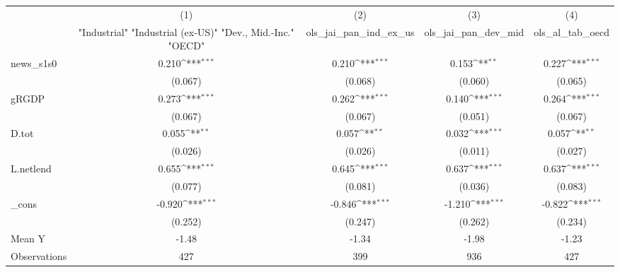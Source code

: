 {
\def\sym#1{\ifmmode^{#1}\else\(^{#1}\)\fi}
\begin{tabular}{l*{4}{c}}
\toprule
            &\multicolumn{1}{c}{(1)}&\multicolumn{1}{c}{(2)}&\multicolumn{1}{c}{(3)}&\multicolumn{1}{c}{(4)}\\
            &\multicolumn{1}{c}{ "Industrial" "Industrial (ex-US)" "Dev., Mid.-Inc." "OECD" }&\multicolumn{1}{c}{ols\_jai\_pan\_ind\_ex\_us}&\multicolumn{1}{c}{ols\_jai\_pan\_dev\_mid}&\multicolumn{1}{c}{ols\_al\_tab\_oecd}\\
\midrule
news\_s1s0   &       0.210\sym{***}&       0.210\sym{***}&       0.153\sym{**} &       0.227\sym{***}\\
            &     (0.067)         &     (0.068)         &     (0.060)         &     (0.065)         \\
\addlinespace
gRGDP       &       0.273\sym{***}&       0.262\sym{***}&       0.140\sym{***}&       0.264\sym{***}\\
            &     (0.067)         &     (0.067)         &     (0.051)         &     (0.067)         \\
\addlinespace
D.tot       &       0.055\sym{**} &       0.057\sym{**} &       0.032\sym{***}&       0.057\sym{**} \\
            &     (0.026)         &     (0.026)         &     (0.011)         &     (0.027)         \\
\addlinespace
L.netlend   &       0.655\sym{***}&       0.645\sym{***}&       0.637\sym{***}&       0.637\sym{***}\\
            &     (0.077)         &     (0.081)         &     (0.036)         &     (0.083)         \\
\addlinespace
\_cons      &      -0.920\sym{***}&      -0.846\sym{***}&      -1.210\sym{***}&      -0.822\sym{***}\\
            &     (0.252)         &     (0.247)         &     (0.262)         &     (0.234)         \\
\midrule
Mean Y      &       -1.48         &       -1.34         &       -1.98         &       -1.23         \\
Observations&         427         &         399         &         936         &         427         \\
\bottomrule
\end{tabular}
}
